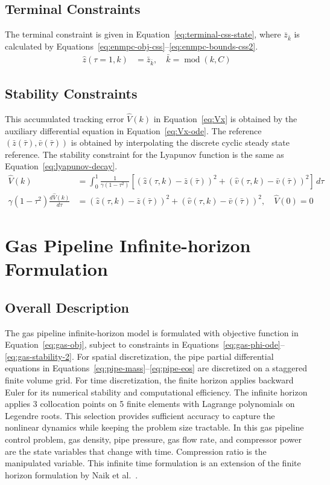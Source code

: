 \documentclass[11pt]{article}
\begin{document}
\subsection{Terminal Constraints}
The terminal constraint is given in Equation~\eqref{eq:terminal-css-state}, where $\bar{z}_{\bar{k}}$ is calculated by Equations~\eqref{eq:enmpc-obj-css}--\eqref{eq:enmpc-bounds-css2}.
\begin{align}
\hat{z}(\tau=1, k) &= \bar{z}_{\bar{k}}, \quad \bar{k} = \operatorname{mod}(k, C) \label{eq:terminal-css-state}
\end{align}
\subsection{Stability Constraints}
This accumulated tracking error $\hat{V}(k)$ in Equation~\eqref{eq:Vx} is obtained by the auxiliary differential equation in Equation~\eqref{eq:Vx-ode}. The reference $(\bar{z}(\bar{\tau}), \bar{v}(\bar{\tau}))$ is obtained by interpolating the discrete cyclic steady state reference. The stability constraint
for the Lyapunov function is the same as Equation~\eqref{eq:lyapunov-decay}.
\begin{align}
\hat{V}(k) &= \int_{0}^{1} \frac{1}{\gamma(1-\tau^2)}\left[ (\hat{z}(\tau, k) - \bar{z}(\bar{\tau}))^2 + (\hat{v}(\tau, k) - \bar{v}(\bar{\tau}))^2 \right] \, d\tau \label{eq:Vx}\\
\gamma(1-\tau^2) \frac{d\hat{V}(k)}{d\tau} &= (\hat{z}(\tau, k) - \bar{z}(\bar{\tau}))^2 + (\hat{v}(\tau, k) - \bar{v}(\bar{\tau}))^2, \quad \hat{V}(0) = 0 \label{eq:Vx-ode}
\end{align}
\section{Gas Pipeline Infinite-horizon Formulation}

\subsection{Overall Description}

The gas pipeline infinite-horizon model is formulated with objective function in Equation~\eqref{eq:gas-obj}, subject to constraints in Equations~\eqref{eq:gas-phi-ode}--\eqref{eq:gas-stability-2}. For spatial discretization, the pipe partial differential equations in Equations~\eqref{eq:pipe-mass}--\eqref{eq:pipe-eos} are discretized on a staggered finite volume grid. For time discretization, the finite horizon applies backward Euler for its numerical stability and computational efficiency. The infinite horizon applies 3 collocation points on 5 finite elements with Lagrange polynomials on Legendre roots. This selection provides sufficient accuracy to capture the nonlinear dynamics while keeping the problem size tractable. In this gas pipeline control problem, gas density, pipe pressure, gas flow rate, and compressor power are the state variables that change with time. Compression ratio is the manipulated variable. This infinite time formulation is an extension of the finite horizon formulation by Naik et al.~\cite{NAIK2026122276}.
\end{document}
